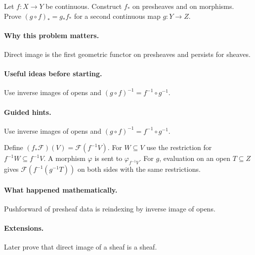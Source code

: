 \begin{problem}
Let $f:X\to Y$ be continuous.  Construct $f_*$ on presheaves and on morphisms.  Prove $(g\circ f)_*=g_*f_*$ for a second continuous map $g:Y\to Z$.
\end{problem}

\paragraph{Why this problem matters.}
Direct image is the first geometric functor on presheaves and persists for sheaves.

\paragraph{Useful ideas before starting.}
Use inverse images of opens and $(g\circ f)^{-1}=f^{-1}\circ g^{-1}$.

\paragraph{Guided hints.}
Use inverse images of opens and $(g\circ f)^{-1}=f^{-1}\circ g^{-1}$.

\begin{solution}
Define $(f_*\mathcal F)(V)=\mathcal F(f^{-1}V)$.  For $W\subseteq V$ use the restriction for $f^{-1}W\subseteq f^{-1}V$.  A morphism $\varphi$ is sent to $\varphi_{f^{-1}V}$.  For $g$, evaluation on an open $T\subseteq Z$ gives $\mathcal F(f^{-1}(g^{-1}T))$ on both sides with the same restrictions.
\end{solution}

\paragraph{What happened mathematically.}
Pushforward of presheaf data is reindexing by inverse image of opens.

\paragraph{Extensions.}
Later prove that direct image of a sheaf is a sheaf.
